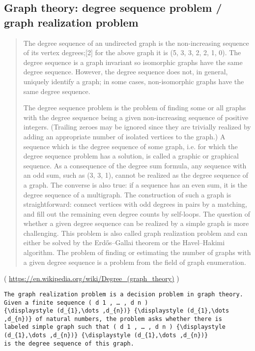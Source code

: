 \subsection{Graph theory: degree sequence problem / graph realization problem}

\renewcommand{\CURPATH}{synth/other/degree_seq}

\begin{framed}
\begin{quotation}
The degree sequence of an undirected graph is the non-increasing sequence of its vertex degrees;[2] for the above graph it is (5, 3, 3, 2, 2, 1, 0).
The degree sequence is a graph invariant so isomorphic graphs have the same degree sequence. However, the degree sequence does not, in general,
uniquely identify a graph; in some cases, non-isomorphic graphs have the same degree sequence.

The degree sequence problem is the problem of finding some or all graphs with the degree sequence being a given non-increasing sequence 
of positive integers. (Trailing zeroes may be ignored since they are trivially realized by adding an appropriate number of isolated vertices 
to the graph.) A sequence which is the degree sequence of some graph, i.e. for which the degree sequence problem has a solution, is called 
a graphic or graphical sequence. As a consequence of the degree sum formula, any sequence with an odd sum, such as (3, 3, 1), cannot be 
realized as the degree sequence of a graph. The converse is also true: if a sequence has an even sum, it is the degree sequence of a multigraph. 
The construction of such a graph is straightforward: connect vertices with odd degrees in pairs by a matching, and fill out the remaining 
even degree counts by self-loops. The question of whether a given degree sequence can be realized by a simple graph is more challenging. 
This problem is also called graph realization problem and can either be solved by the Erdős–Gallai theorem or the Havel–Hakimi algorithm.
The problem of finding or estimating the number of graphs with a given degree sequence is a problem from the field of graph enumeration. 
\end{quotation}
\end{framed}

( \url{https://en.wikipedia.org/wiki/Degree_(graph_theory)} )

\begin{lstlisting}
The graph realization problem is a decision problem in graph theory. Given a finite sequence ( d 1 , … , d n )
{\displaystyle (d_{1},\dots ,d_{n})} {\displaystyle (d_{1},\dots ,d_{n})} of natural numbers, the problem asks whether there is 
labeled simple graph such that ( d 1 , … , d n ) {\displaystyle (d_{1},\dots ,d_{n})} {\displaystyle (d_{1},\dots ,d_{n})} 
is the degree sequence of this graph. 
\end{lstlisting}

